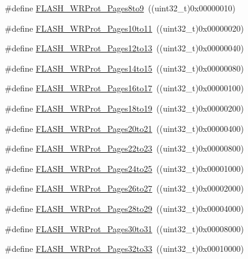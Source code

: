 \begin{DoxyCompactItemize}
\item 
\#define \hyperlink{group__Option__Bytes__Write__Protection_ga72f231c0fe953f3cd43cf421c2626f90}{FLASH\_\-WRProt\_\-Pages8to9}~((uint32\_\-t)0x00000010)
\item 
\#define \hyperlink{group__Option__Bytes__Write__Protection_ga778d8038df46c0d25d9a24717a5c5dc9}{FLASH\_\-WRProt\_\-Pages10to11}~((uint32\_\-t)0x00000020)
\item 
\#define \hyperlink{group__Option__Bytes__Write__Protection_ga571e248a64ef9bf7f99ed85831aacaaa}{FLASH\_\-WRProt\_\-Pages12to13}~((uint32\_\-t)0x00000040)
\item 
\#define \hyperlink{group__Option__Bytes__Write__Protection_ga5e5fcead35c861e1329c3e4e7e3ffa4e}{FLASH\_\-WRProt\_\-Pages14to15}~((uint32\_\-t)0x00000080)
\item 
\#define \hyperlink{group__Option__Bytes__Write__Protection_ga33deabc2c4a82cfa4a98008082e29ea7}{FLASH\_\-WRProt\_\-Pages16to17}~((uint32\_\-t)0x00000100)
\item 
\#define \hyperlink{group__Option__Bytes__Write__Protection_ga856fdcf3d41edc73902fcf93a1e375d9}{FLASH\_\-WRProt\_\-Pages18to19}~((uint32\_\-t)0x00000200)
\item 
\#define \hyperlink{group__Option__Bytes__Write__Protection_ga09215d5d245c8f5cd664c5cc4ff9fb69}{FLASH\_\-WRProt\_\-Pages20to21}~((uint32\_\-t)0x00000400)
\item 
\#define \hyperlink{group__Option__Bytes__Write__Protection_ga58394c78e6b08542381ade1674efe62c}{FLASH\_\-WRProt\_\-Pages22to23}~((uint32\_\-t)0x00000800)
\item 
\#define \hyperlink{group__Option__Bytes__Write__Protection_gac36c4a402c77b28f46451e97dc3632f7}{FLASH\_\-WRProt\_\-Pages24to25}~((uint32\_\-t)0x00001000)
\item 
\#define \hyperlink{group__Option__Bytes__Write__Protection_ga92c8a9f8b6875fccb072df795eff5e7e}{FLASH\_\-WRProt\_\-Pages26to27}~((uint32\_\-t)0x00002000)
\item 
\#define \hyperlink{group__Option__Bytes__Write__Protection_gae42c20bedcbaf926c7c49f51a7eea63f}{FLASH\_\-WRProt\_\-Pages28to29}~((uint32\_\-t)0x00004000)
\item 
\#define \hyperlink{group__Option__Bytes__Write__Protection_gaabe41461f613c6eb37c782295ad9f90f}{FLASH\_\-WRProt\_\-Pages30to31}~((uint32\_\-t)0x00008000)
\item 
\#define \hyperlink{group__Option__Bytes__Write__Protection_ga86aa121a8917e58ad6bfdf98ba873d36}{FLASH\_\-WRProt\_\-Pages32to33}~((uint32\_\-t)0x00010000)

\end{DoxyCompactItemize}
